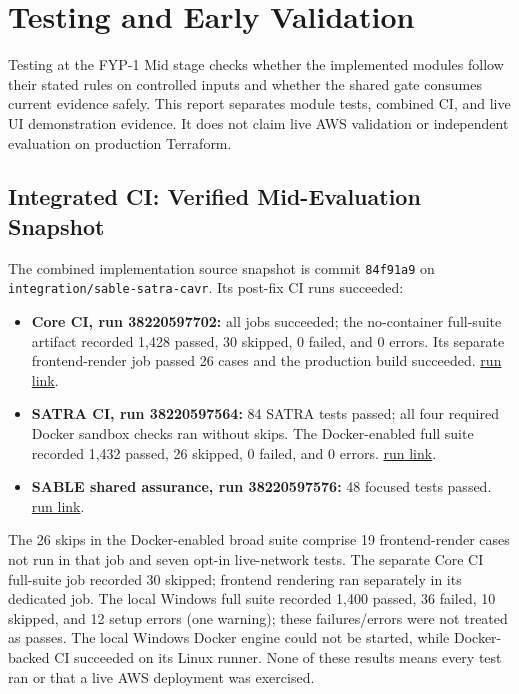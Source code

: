 \chapter{Testing and Early Validation}
\begin{sloppypar}
Testing at the FYP-1 Mid stage checks whether the implemented modules follow their stated rules on controlled inputs and whether the shared gate consumes current evidence safely. This report separates module tests, combined CI, and live UI demonstration evidence. It does not claim live AWS validation or independent evaluation on production Terraform.
\end{sloppypar}

\section{Integrated CI: Verified Mid-Evaluation Snapshot}
The combined implementation source snapshot is commit \texttt{84f91a9} on \texttt{integration/sable-satra-cavr}. Its post-fix CI runs succeeded:
\begin{itemize}
    \item \textbf{Core CI, run 38220597702:} all jobs succeeded; the no-container full-suite artifact recorded 1,428 passed, 30 skipped, 0 failed, and 0 errors. Its separate frontend-render job passed 26 cases and the production build succeeded. \href{https://github.com/SheharyarAli-Dev/Working-POC/actions/runs/38220597702}{run link}.
    \item \textbf{SATRA CI, run 38220597564:} 84 SATRA tests passed; all four required Docker sandbox checks ran without skips. The Docker-enabled full suite recorded 1,432 passed, 26 skipped, 0 failed, and 0 errors. \href{https://github.com/SheharyarAli-Dev/Working-POC/actions/runs/38220597564}{run link}.
    \item \textbf{SABLE shared assurance, run 38220597576:} 48 focused tests passed. \href{https://github.com/SheharyarAli-Dev/Working-POC/actions/runs/38220597576}{run link}.
\end{itemize}
The 26 skips in the Docker-enabled broad suite comprise 19 frontend-render cases not run in that job and seven opt-in live-network tests. The separate Core CI full-suite job recorded 30 skipped; frontend rendering ran separately in its dedicated job. The local Windows full suite recorded 1,400 passed, 36 failed, 10 skipped, and 12 setup errors (one warning); these failures/errors were not treated as passes. The local Windows Docker engine could not be started, while Docker-backed CI succeeded on its Linux runner. None of these results means every test ran or that a live AWS deployment was exercised.

